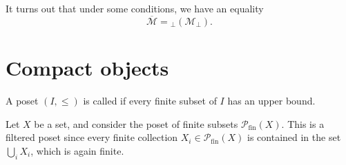 \documentclass[main.tex]{subfiles}
\begin{document}
It turns out that under some conditions, we have an equality
\begin{equation*}
  \overline{\mathcal{M}} = {}_{\perp}(\mathcal{M}_{\perp}).
\end{equation*}

\section{Compact objects}
\label{sec:compact_objects}

\begin{definition}
  \label{def:filtered_poset}
  A poset $(I, \leq)$ is called  if every finite subset of $I$ has an upper bound.
\end{definition}

\begin{example}
  \label{eg:poset_of_finite_subsets}
  Let $X$ be a set, and consider the poset of finite subsets $\mathcal{P}_{\mathrm{fin}}(X)$. This is a filtered poset since every finite collection $X_{i} \in \mathcal{P}_{\mathrm{fin}}(X)$ is contained in the set $\bigcup_{i} X_{i}$, which is again finite.
\end{example}
\end{document}

